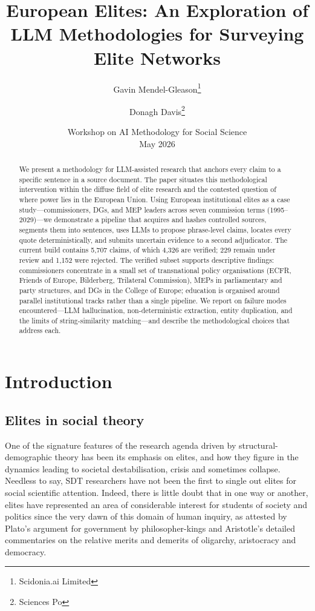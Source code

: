 \documentclass[11pt,a4paper]{article}
\title{European Elites: An Exploration of LLM Methodologies for Surveying Elite Networks}
\author{Gavin Mendel-Gleason\thanks{Scidonia.ai Limited} \and Donagh Davis\thanks{Sciences Po}}
\date{Workshop on AI Methodology for Social Science \\ May 2026}
\begin{document}
\maketitle

\begin{abstract}
We present a methodology for LLM-assisted research that anchors every claim to a specific sentence in a source document. The paper situates this methodological intervention within the diffuse field of elite research and the contested question of where power lies in the European Union. Using European institutional elites as a case study---commissioners, DGs, and MEP leaders across seven commission terms (1995--2029)---we demonstrate a pipeline that acquires and hashes controlled sources, segments them into sentences, uses LLMs to propose phrase-level claims, locates every quote deterministically, and submits uncertain evidence to a second adjudicator. The current build contains 5,707 claims, of which 4,326 are verified; 229 remain under review and 1,152 were rejected. The verified subset supports descriptive findings: commissioners concentrate in a small set of transnational policy organisations (ECFR, Friends of Europe, Bilderberg, Trilateral Commission), MEPs in parliamentary and party structures, and DGs in the College of Europe; education is organised around parallel institutional tracks rather than a single pipeline. We report on failure modes encountered---LLM hallucination, non-deterministic extraction, entity duplication, and the limits of string-similarity matching---and describe the methodological choices that address each.
\end{abstract}

\section{Introduction}

\subsection{Elites in social theory}

One of the signature features of the research agenda driven by structural-demographic theory has been its emphasis on elites, and how they figure in the dynamics leading to societal destabilisation, crisis and sometimes collapse. Needless to say, SDT researchers have not been the first to single out elites for social scientific attention. Indeed, there is little doubt that in one way or another, elites have represented an area of considerable interest for students of society and politics since the very dawn of this domain of human inquiry, as attested by Plato's argument for government by philosopher-kings and Aristotle's detailed commentaries on the relative merits and demerits of oligarchy, aristocracy and democracy.
\end{document}
